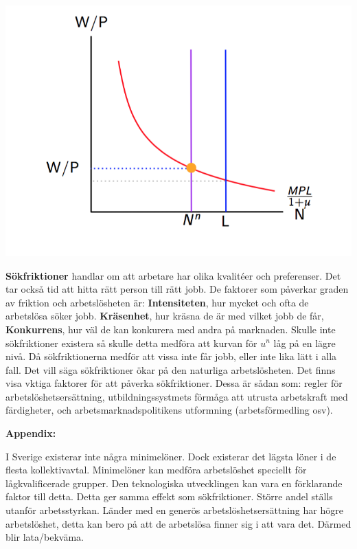 \documentclass{article}
\begin{document}
\includegraphics[scale = 0.5]{skarm5} \par

\textbf{Sökfriktioner} handlar om att arbetare har olika kvalitéer och preferenser. Det tar också tid att hitta rätt person till rätt jobb. De faktorer som påverkar graden av friktion och arbetslösheten är: \textbf{Intensiteten}, hur mycket och ofta de arbetslösa söker jobb. \textbf{Kräsenhet}, hur kräsna de är med vilket jobb de får, \textbf{Konkurrens}, hur väl de kan konkurera med andra på marknaden. Skulle inte sökfriktioner existera så skulle detta medföra att kurvan för $ u^n $ låg på en lägre nivå. Då sökfriktionerna medför att vissa inte får jobb, eller inte lika lätt i alla fall. Det vill säga sökfriktioner ökar på den naturliga arbetslösheten. Det finns visa vktiga faktorer för att påverka sökfriktioner. Dessa är sådan som: regler för arbetslöshetsersättning, utbildningssystmets förmåga att utrusta arbetskraft med färdigheter, och arbetsmarknadspolitikens utformning (arbetsförmedling osv). \par \noindent \vspace{5mm} \textbf{Appendix:} \par \noindent 
I Sverige existerar inte några minimelöner. Dock existerar det lägsta löner i de flesta kollektivavtal. Minimelöner kan medföra arbetslöshet speciellt för lågkvalificerade grupper. Den teknologiska utvecklingen kan vara en förklarande faktor till detta. Detta ger samma effekt som sökfriktioner. Större andel ställs utanför arbetsstyrkan. Länder med en generös arbetslöshetsersättning har högre arbetslöshet, detta kan bero på att de arbetslösa finner sig i att vara det. Därmed blir lata/bekväma. 
\end{document}
